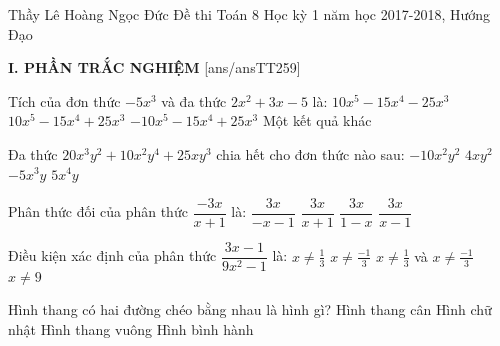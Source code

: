 \begin{name}
{Thầy Lê Hoàng Ngọc Đức}
{Đề thi Toán 8 Học kỳ 1 năm học 2017-2018, Hướng Đạo}
\end{name}
\noindent\textbf{I. PHẦN TRẮC NGHIỆM}
\setcounter{ex}{0}
[ans/ansTT259]
\begin{ex}%
	Tích của đơn thức $-5x^3$ và đa thức $2x^2+3x-5$ là:
	\choice
	{$10x^5-15x^4-25x^3$}
	{$10x^5-15x^4+25x^3$}
	{\True $-10x^5-15x^4+25x^3$}
	{Một kết quả khác}
\end{ex}
\begin{ex}%
	Đa thức $20x^3y^2+10x^2y^4+25xy^3$ chia hết cho đơn thức nào sau:
	\choice
	{$-10x^2y^2$}
	{\True $4xy^2$}
	{$-5x^3y$}
	{$5x^4y$}
\end{ex}
\begin{ex}%
	Phân thức đối của phân thức $\dfrac{-3x}{x+1}$ là:
	\choice
	{ \True $\dfrac{3x}{-x-1}$}
	{ $\dfrac{3x}{x+1}$}
	{ $\dfrac{3x}{1-x}$}
	{ $\dfrac{3x}{x-1}$}
\end{ex}
\begin{ex}%
	Điều kiện xác định của phân thức $\dfrac{3x-1}{9x^2-1}$ là:
	\choice
	{$x\neq\frac{1}{3}$}
	{$x\neq\frac{-1}{3}$}
	{\True $x\neq\frac{1}{3}$ và $x\neq\frac{-1}{3}$}
	{$x\neq9$}
\end{ex}
\begin{ex}%
	Hình thang có hai đường chéo bằng nhau là hình gì?
	\choice
	{ \True Hình thang cân}
	{Hình chữ nhật}
	{Hình thang vuông}
	{Hình bình hành}
	\loigiai{ }
\end{ex}
